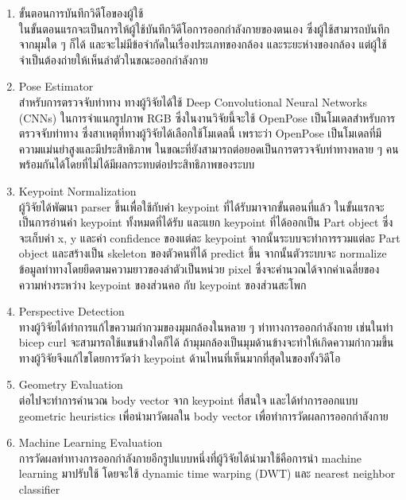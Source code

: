 \begin{enumerate}
    \item ขั้นตอนการบันทึกวิดีโอของผู้ใช้\\
    ในขั้นตอนแรกจะเป็นการให้ผู้ใช้บันทึกวิดีโอการออกกำลังกายของตนเอง ซึ่งผู้ใช้สามารถบันทึกจากมุมใด ๆ ก็ได้ และจะไม่มีข้อจำกัดในเรื่องประเภทของกล้อง และระยะห่างของกล้อง แต่ผู้ใช้จำเป็นต้องถ่ายให้เห็นลำตัวในขณะออกกำลังกาย
    \item Pose Estimator\\
    สำหรับการตรวจจับท่าทาง ทางผู้วิจัยได้ใช้ Deep Convolutional Neural Networks (CNNs) ในการจำแนกรูปภาพ RGB ซึ่งในงานวิจัยนี้จะใช้ OpenPose เป็นโมเดลสำหรับการตรวจจับท่าทาง ซึ่งสาเหตุที่ทางผู้วิจัยได้เลือกใช้โมเดลนี้ เพราะว่า OpenPose เป็นโมเดลที่มีความแม่นยำสูงและมีประสิทธิภาพ ในขณะที่ยังสามารถต่อยอดเป็นการตรวจจับท่าทางหลาย ๆ คนพร้อมกันได้โดยที่ไม่ได้มีผลกระทบต่อประสิทธิภาพของระบบ
    \item Keypoint Normalization\\
    ผู้วิจัยได้พัฒนา parser ขึ้นเพื่อใช้กับค่า keypoint ที่ได้รับมาจากขั้นตอนที่แล้ว ในขั้นแรกจะเป็นการอ่านค่า keypoint ทั้งหมดที่ได้รับ และแยก keypoint ที่ได้ออกเป็น Part object ซึ่งจะเก็บค่า x, y และค่า confidence ของแต่ละ keypoint จากนั้นระบบจะทำการรวมแต่ละ Part object และสร้างเป็น skeleton ของตัวคนที่ได้ predict ขึ้น จากนั้นตัวระบบจะ normalize ข้อมูลท่าทางโดยยึดตามความยาวของลำตัวเป็นหน่วย pixel ซึ่งจะคำนวณได้จากค่าเฉลี่ยของความห่างระหว่าง keypoint ของส่วนคอ กับ keypoint ของส่วนสะโพก
    \item Perspective Detection\\
    ทางผู้วิจัยได้ทำการแก้ไขความกำกวมของมุมกล้องในหลาย ๆ ท่าทางการออกกำลังกาย เช่นในท่า bicep curl จะสามารถใช้แขนข้างใดก็ได้ ถ้ามุมกล้องเป็นมุมด้านข้างจะทำให้เกิดความกำกวมขึ้น ทางผู้วิจัยจึงแก้ไขโดยการวัดว่า keypoint ด้านไหนที่เห็นมากที่สุดในของทั้งวิดีโอ
    \item Geometry Evaluation\\
    ต่อไปจะทำการคำนวณ body vector จาก keypoint ที่สนใจ และได้ทำการออกแบบ geometric heuristics เพื่อนำมาวัดผลใน body vector เพื่อทำการวัดผลการออกกำลังกาย
    \item Machine Learning Evaluation\\
    การวัดผลท่าทางการออกกำลังกายอีกรูปแบบหนึ่งที่ผู้วิจัยได้นำมาใช้คือการนำ machine learning มาปรับใช้ โดยจะใช้ dynamic time warping (DWT) และ nearest neighbor classifier
\end{enumerate}

